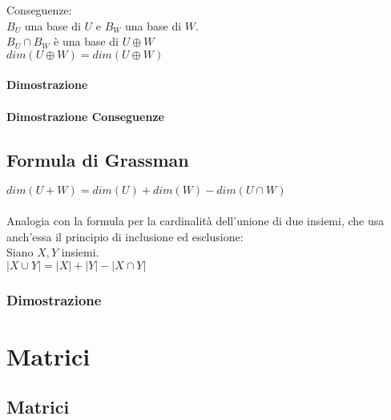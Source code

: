 \documentclass[a4paper, twoside, italian, 11pt]{book}
\newcommand{\card}[1] {\left | #1 \right |}
\begin{document}
\noindent
Conseguenze: \\

\noindent
$B_U$ una base di $U$ e $B_W$ una base di $W$. \\
$B_U \cap B_W$ è una base di $U \oplus W$ \\

\noindent
$dim(U \oplus W) = dim(U \oplus W)$


\subsubsection{Dimostrazione}



\subsubsection{Dimostrazione Conseguenze}




\section{Formula di Grassman}

$dim(U + W) = dim(U) + dim(W) - dim(U \cap W)$ \\\\

\noindent
Analogia con la formula per la cardinalità dell'unione di due insiemi, che usa anch'essa il principio di inclusione ed esclusione: \\

\noindent
Siano $X, Y$ insiemi. \\

\noindent
$\card{X \cup Y} = \card X + \card Y - \card{X \cap Y}$


\subsection{Dimostrazione}




\chapter{Matrici}



\section {Matrici}
\end{document}
